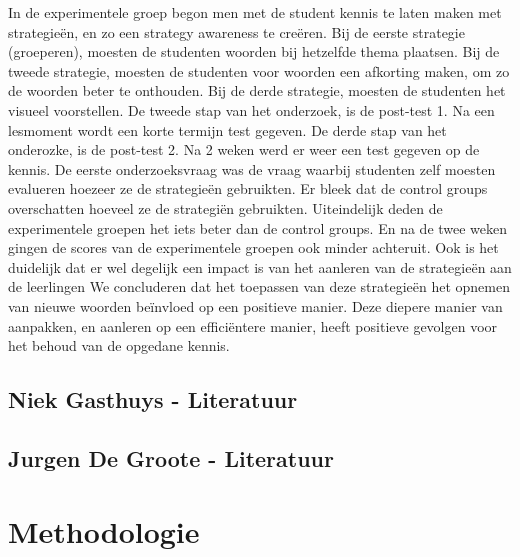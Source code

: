 \documentclass{voorstel}
\begin{document}
	In de experimentele groep begon men met de student kennis te laten maken met strategieën, en zo een strategy awareness te creëren. Bij de eerste strategie (groeperen), moesten de studenten woorden bij hetzelfde thema plaatsen. Bij de tweede strategie, moesten de studenten voor woorden een afkorting maken, om zo de woorden beter te onthouden. Bij de derde strategie, moesten de studenten het visueel voorstellen.
	De tweede stap van het onderzoek, is de post-test 1. Na een lesmoment wordt een korte termijn test gegeven.
	De derde stap van het onderozke, is de post-test 2. Na 2 weken werd er weer een test gegeven op de kennis.
	De eerste onderzoeksvraag was de vraag waarbij studenten zelf moesten evalueren hoezeer ze de strategieën gebruikten. Er bleek dat de control groups overschatten hoeveel ze de strategiën gebruikten. Uiteindelijk deden de experimentele groepen het iets beter dan de control groups. En na de twee weken gingen de scores van de experimentele groepen ook minder achteruit.
	Ook is het duidelijk dat er wel degelijk een impact is van het aanleren van de strategieën aan de leerlingen
	We concluderen dat het toepassen van deze strategieën het opnemen van nieuwe woorden beïnvloed op een positieve manier. Deze diepere manier van aanpakken, en aanleren op een efficiëntere manier, heeft positieve gevolgen voor het behoud van de opgedane kennis.
	
	\subsection{Niek Gasthuys - Literatuur}
	\subsection{Jurgen De Groote - Literatuur}
	
	\section{Methodologie}
	\label{sec:methodologie}
	
\end{document}
